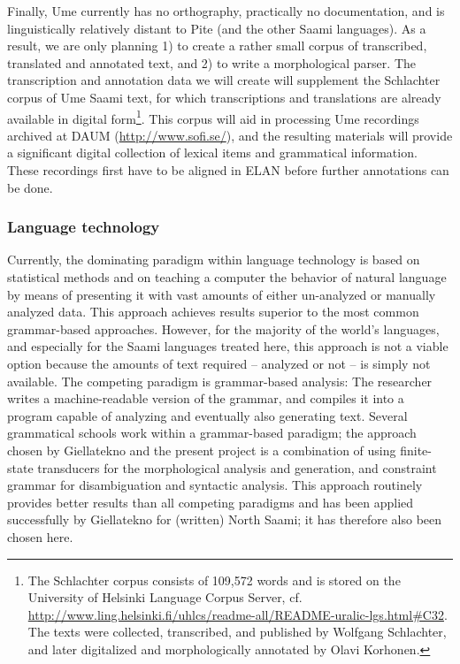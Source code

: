 \documentclass[a4paper,12pt]{article}
\begin{document}
Finally, Ume currently has no orthography, practically no documentation, and is linguistically relatively distant to Pite (and the other Saami languages). As a result, we are only planning 1) to create a rather small corpus of transcribed, translated and annotated text, and 2) to write a morphological parser. The transcription and annotation data we will create will supplement the Schlachter corpus of Ume Saami text, for which transcriptions and translations are already available in digital form\footnote{The Schlachter corpus consists of 109,572 words and is stored on the University of Helsinki Language Corpus Server, cf. \url{http://www.ling.helsinki.fi/uhlcs/readme-all/README-uralic-lgs.html#C32}. The texts were collected, transcribed, and published by Wolfgang Schlachter, and later digitalized and morphologically annotated by Olavi Korhonen.}. This corpus will aid in processing Ume recordings archived at DAUM (\url{http://www.sofi.se/}), and the resulting materials will provide a significant digital collection of lexical items and grammatical information. These recordings first have to be aligned in ELAN before further annotations can be done. 

\subsubsection{Language technology}

Currently, the dominating paradigm within language technology is based on statistical methods and on teaching a computer the behavior of natural language by means of presenting it with vast amounts of either un-analyzed or manually analyzed data. This approach achieves results superior to the most common grammar-based approaches. However, for the majority of the world's languages, and especially for the Saami languages treated here, this approach is not a viable option because the amounts of text required – analyzed or not – is simply not available. The competing paradigm is grammar-based analysis: The researcher writes a machine-readable version of the grammar, and compiles it into a program capable of analyzing and eventually also generating text. Several grammatical schools work within a grammar-based paradigm; the approach chosen by Giellatekno and the present project is a combination of using finite-state transducers for the morphological analysis and generation, and constraint grammar for disambiguation and syntactic analysis. This approach routinely provides better results than all competing paradigms and has been applied successfully by Giellatekno for (written) North Saami; it has therefore also been chosen here.
\end{document}
